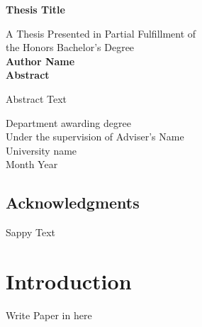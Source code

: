 \documentclass{article}
\begin{document}
\begin{titlepage}
\begin{center}
\vspace{1cm}
\huge
\textbf{Thesis Title}

\LARGE
\vspace{.5cm}
A Thesis Presented in Partial Fulfillment of\\ the Honors Bachelor's Degree\\
\vspace{.5cm}
\textbf{Author Name}\\
\vspace{.5cm}
\Large
\vspace{.5cm}
\Large
\textbf{Abstract}
\end{center}
Abstract Text

\vfill
\begin{center}	
Department awarding degree\\
Under the supervision of Adviser's Name\\
University name\\
Month Year\\
\end{center}
\end{titlepage}
\tableofcontents
\listoffigures
\listoftables
\pagebreak
{}
\begin{center}\section*{Acknowledgments}\end{center}
Sappy Text

\pagebreak
{}
\section{Introduction}
Write Paper in here


\pagebreak
{}

\nocite{*}
% 
\end{document}
